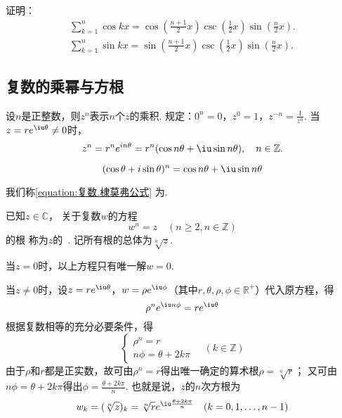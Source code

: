 \begin{example}
证明：\begin{gather}
\sum_{k=1}^n \cos kx
    = \cos(\frac{n+1}{2}x)
    \csc(\frac{1}{2}x)
    \sin(\frac{n}{2}x). \\
\sum_{k=1}^n \sin kx
    = \sin(\frac{n+1}{2}x)
    \csc(\frac{1}{2}x)
    \sin(\frac{n}{2}x).
\end{gather}
\end{example}

\subsection{复数的乘幂与方根}
\begin{definition}
设\(n\)是正整数，则\(z^n\)表示\(n\)个\(z\)的乘积.
规定：\(0^n=0\)，\(z^0=1\)，\(z^{-n}=\frac{1}{z^n}\).
当\(z=re^{\iu\theta} \neq 0\)时，\begin{equation*}
z^n = r^n e^{in\theta} = r^n(\cos n\theta+\iu\sin n\theta),
\quad n \in \mathbb{Z}.
\end{equation*}
\end{definition}

\begin{theorem}[棣莫弗公式]
\begin{equation}\label{equation:复数.棣莫弗公式}
	(\cos\theta+i\sin\theta)^n = \cos{n\theta}+\iu\sin{n\theta}
\end{equation}
\end{theorem}
我们称\cref{equation:复数.棣莫弗公式} 为.

\begin{definition}[复数的方根]
已知\(z\in\mathbb{C}\)，
关于复数\(w\)的方程\begin{equation*}
	w^n = z \quad (n \geq 2, n \in \mathbb{Z})
\end{equation*}的根
称为\(z\)的~.
记所有根的总体为\(\sqrt[n]{z}\).

当\(z=0\)时，以上方程只有唯一解\(w = 0\).

当\(z \neq 0\)时，设\(z=re^{\iu\theta}\)，\(w=\rho e^{\iu\phi}\)（其中\(r,\theta,\rho,\phi\in\mathbb{R}^+\)）代入原方程，得\begin{equation*}
\rho^n e^{\iu n \phi} = r e^{\iu\theta}
\end{equation*}根据复数相等的充分必要条件，得\begin{equation*}
\left\{ \begin{array}{l}
\rho^n = r \\
n\phi = \theta + 2k\pi
\end{array} \right. \quad (k \in \mathbb{Z})
\end{equation*}由于\(\rho\)和\(r\)都是正实数，故可由\(\rho^n=r\)得出唯一确定的算术根\(\rho=\sqrt[n]{r}\)；
又可由\(n\phi=\theta+2k\pi\)得出\(\phi=\frac{\theta+2k\pi}{n}\).
也就是说，\(z\)的\(n\)次方根为\begin{equation*}
w_k = (\sqrt[n]{z})_k = \sqrt[n]{r} e^{\iu \frac{\theta + 2k\pi}{n}} \quad (k=0,1,\dotsc,n-1)
\end{equation*}
\end{definition}

